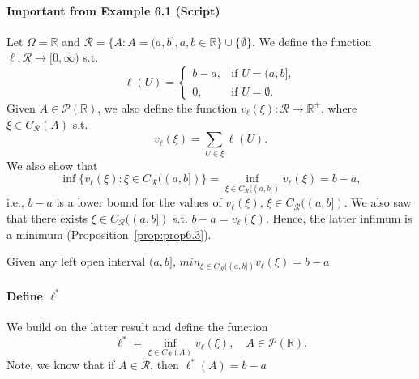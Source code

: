 \paragraph{Important from Example 6.1 (Script)}%
\label{par:Important from Example 6.1 in the Script}
Let $\Omega = \mathbb{R}$ and $\mathcal{R} = \{A: A = (a,b], a,b \in \mathbb{R}\} \cup \{\emptyset\}  $.
We define the function 
$\ell: \mathcal{R} \to [0, \infty)$ s.t.
\[
\ell(U) =
\begin{cases}
    b-a, & \text{if } U = (a,b], \\
    0, & \text{if } U = \emptyset.
\end{cases}
\] 
Given $A \in \mathcal{P}(\mathbb{R})$, we also define the function $v_{\ell}( \xi ): \mathcal{R} \to \mathbb{R}^{+}$, where $ \xi \in C_\mathcal{R}(A)$ s.t.
\[
    v_{\ell}( \xi ) = \sum_{U \in \xi} \ell(U)
.\] 
We also show that
\[
    \inf \{v_{\ell}( \xi ) : \xi \in C_\mathcal{R}((a,b])\} = \inf_{\xi \in C_{\mathcal{R}}((a, b])} {v_{\ell}(\xi) = b - a,} \tag{11}
\] 
i.e., $b-a$ is a lower bound for the values of $v_{ \ell}( \xi)$, $ \xi \in C_\mathcal{R}((a,b])$. We also saw that there
exists $ \xi \in C_\mathcal{R}((a,b])$ s.t. $b-a = v_{\ell}( \xi)$. Hence, the latter infimum is a 
minimum (Proposition~\ref{prop:prop6.3}).

\begin{proposition}[]
    \label{prop:prop6.3}
    Given any left open interval $(a,b]$, $min_{  \xi \in C_\mathcal{R}((a,b])} v_{\ell}( \xi) = b-a$
\end{proposition}

\paragraph{Define $\ell^\ast$}%
\label{par:Define_l_star}
We build on the latter result and define the function 
\[
    \ell^{\ast} = \inf_{\xi \in C_{\mathcal{R}}(A)} {v_{\ell}(\xi)}, \quad A \in \mathcal{P}(\mathbb{R})
.\] 
Note, we know that if $A \in \mathcal{R}$, then $\ell^{\ast}(A) = b-a$





